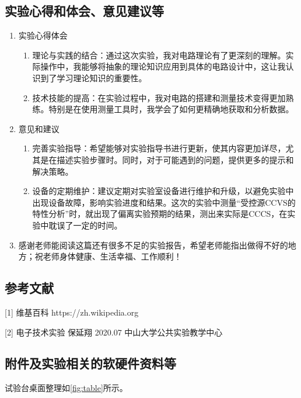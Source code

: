 \documentclass[dvipsnames, svgnames,a4paper,11pt]{article}
\begin{document}
	\subsection{实验心得和体会、意见建议等}
	\begin{enumerate}
		\item 实验心得体会
			\begin{enumerate}
				\item 理论与实践的结合：通过这次实验，我对电路理论有了更深刻的理解。实际操作中，我能够将抽象的理论知识应用到具体的电路设计中，这让我认识到了学习理论知识的重要性。
				
				\item 技术技能的提高：在实验过程中，我对电路的搭建和测量技术变得更加熟练。特别是在使用测量工具时，我学会了如何更精确地获取和分析数据。
				
			\end{enumerate}
		
		\item 意见和建议
			\begin{enumerate}
				\item 完善实验指导：希望能够对实验指导书进行更新，使其内容更加详尽，尤其是在描述实验步骤时。同时，对于可能遇到的问题，提供更多的提示和解决策略。
				
				\item 设备的定期维护：建议定期对实验室设备进行维护和升级，以避免实验中出现设备故障，影响实验进度和结果。这次的实验中测量“受控源CCVS的特性分析”时，就出现了偏离实验预期的结果，测出来实际是CCCS，在实验中耽误了一定的时间。
				

			\end{enumerate}
			
		\item 感谢老师能阅读这篇还有很多不足的实验报告，希望老师能指出做得不好的地方；祝老师身体健康、生活幸福、工作顺利！
	\end{enumerate}
	
	\subsection{参考文献}
	[1] 维基百科 https://zh.wikipedia.org
	
	[2] 电子技术实验 保延翔 2020.07 中山大学公共实验教学中心
	
	
	\subsection{附件及实验相关的软硬件资料等}
	试验台桌面整理如\cref{fig:table}所示。
\end{document}
